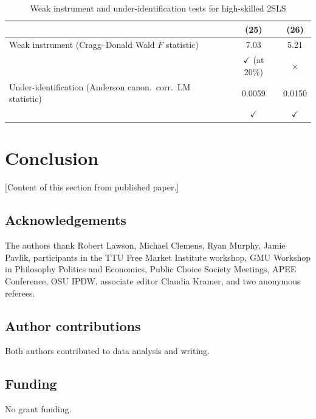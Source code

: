 \documentclass[12pt]{article}
\begin{document}
\begin{table}[H]
\centering
\caption{Weak instrument and under-identification tests for high-skilled 2SLS}
\label{tab:instrument_tests_highskill}
\begin{threeparttable}
\begin{tabular}{@{}lcc@{}}
\toprule
 & (25) & (26) \\
\midrule
Weak instrument (Cragg--Donald Wald $F$ statistic) & 7.03 & 5.21 \\
 & $\checkmark$ (at 20\%) & $\times$ \\[4pt]
Under-identification (Anderson canon.\ corr.\ LM statistic) & 0.0059 & 0.0150 \\
 & $\checkmark$ & $\checkmark$ \\
\bottomrule
\end{tabular}
\end{threeparttable}
\end{table}

\section{Conclusion}
\label{sec:conclusion}

[Content of this section from published paper.]


\subsection*{Acknowledgements}
The authors thank Robert Lawson, Michael Clemens, Ryan Murphy, Jamie Pavlik, participants in the TTU Free Market Institute workshop, GMU Workshop in Philosophy Politics and Economics, Public Choice Society Meetings, APEE Conference, OSU IPDW, associate editor Claudia Kramer, and two anonymous referees.

\subsection*{Author contributions}
Both authors contributed to data analysis and writing.

\subsection*{Funding}
No grant funding.
\end{document}
